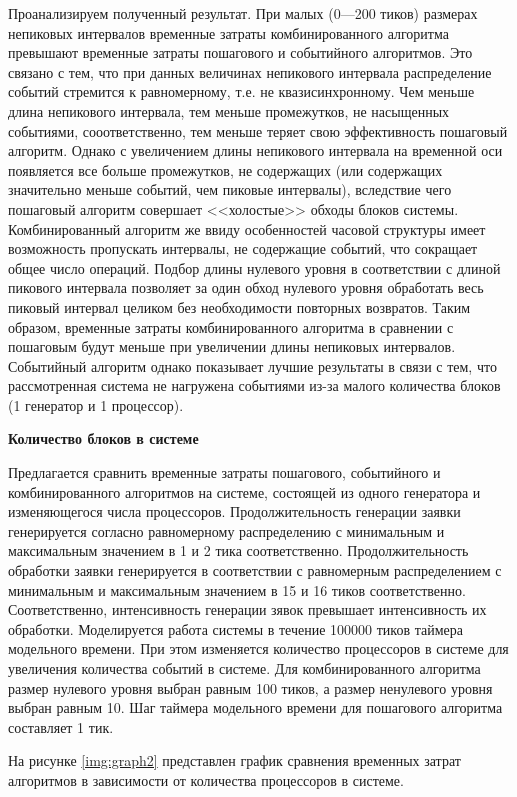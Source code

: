 Проанализируем полученный результат. При малых (0---200 тиков) размерах непиковых интервалов временные затраты комбинированного алгоритма превышают временные затраты пошагового и событийного алгоритмов. Это связано с тем, что при данных величинах непикового интервала распределение событий стремится к равномерному, т.е. не квазисинхронному. Чем меньше длина непикового интервала, тем меньше промежутков, не насыщенных событиями, сооответственно, тем меньше теряет свою эффективность пошаговый алгоритм. Однако с увеличением длины непикового интервала на временной оси появляется все больше промежутков, не содержащих (или содержащих значительно меньше событий, чем пиковые интервалы), вследствие чего пошаговый алгоритм совершает <<холостые>> обходы блоков системы. Комбинированный алгоритм же ввиду особенностей часовой структуры имеет возможность пропускать интервалы, не содержащие событий, что сокращает общее число операций. Подбор длины нулевого уровня в соответствии с длиной пикового интервала позволяет за один обход нулевого уровня обработать весь пиковый интервал целиком без необходимости повторных возвратов. Таким образом, временные затраты комбинированного алгоритма в сравнении с пошаговым будут меньше при увеличении длины непиковых интервалов.
Событийный алгоритм однако показывает лучшие результаты в связи с тем, что рассмотренная система не нагружена событиями из-за малого количества блоков (1 генератор и 1 процессор). 


\textbf{Количество блоков в системе}

Предлагается сравнить временные затраты пошагового, событийного и комбинированного алгоритмов на системе, состоящей из одного генератора и изменяющегося числа процессоров. Продолжительность генерации заявки генерируется согласно равномерному распределению с минимальным и максимальным значением в 1 и 2 тика соответственно. Продолжительность обработки заявки генерируется в соответствии с равномерным распределением с минимальным и максимальным значением в 15 и 16 тиков соответственно. Соответственно, интенсивность генерации зявок превышает интенсивность их обработки. Моделируется работа системы в течение 100000 тиков таймера модельного времени. При этом изменяется количество процессоров в системе для увеличения количества событий в системе. Для комбинированного алгоритма размер нулевого уровня выбран равным 100 тиков, а размер ненулевого уровня выбран равным 10. Шаг таймера модельного времени для пошагового алгоритма составляет 1 тик.

На рисунке \ref{img:graph2} представлен график сравнения временных затрат алгоритмов в зависимости от количества процессоров в системе.

